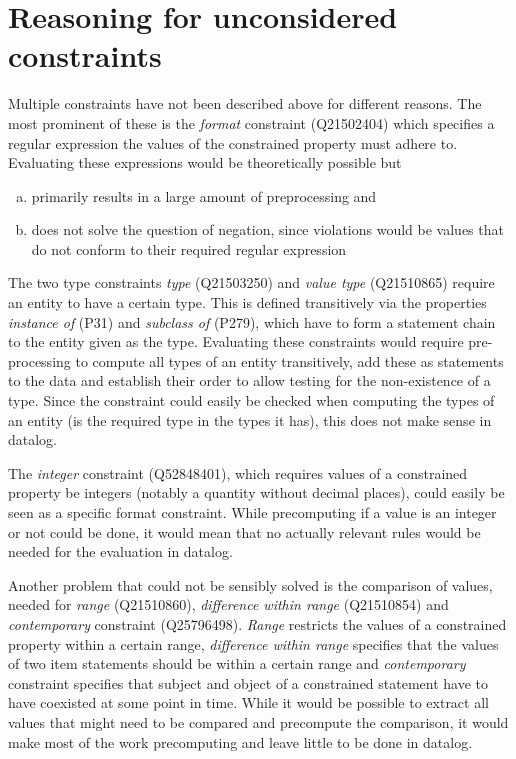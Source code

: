 \documentclass[hyperref,bachelorofscience,fleqn]{cgvpub}
\begin{document}
\section{Reasoning for unconsidered constraints}
Multiple constraints have not been described above for different reasons. The most prominent of these is the \emph{format} constraint (Q21502404) which specifies a regular expression the values of the constrained property must adhere to. Evaluating these expressions would be theoretically possible but \\
\begin{enumerate}[a)]
\item primarily results in a large amount of preprocessing and
\item does not solve the question of negation, since violations would be values that do not conform to their required regular expression
\end{enumerate}

The two type constraints \emph{type} (Q21503250) and \emph{value type} (Q21510865) require an entity to have a certain type. This is defined transitively via the properties \emph{instance of} (P31) and \emph{subclass of} (P279), which have to form a statement chain to the entity given as the type. Evaluating these constraints would require pre-processing to compute all types of an entity transitively, add these as statements to the data and establish their order to allow testing for the non-existence of a type. Since the constraint could easily be checked when computing the types of an entity (is the required type in the types it has), this does not make sense in datalog.

The \emph{integer} constraint (Q52848401), which requires values of a constrained property be integers (notably a quantity without decimal places), could easily be seen as a specific format constraint. While precomputing if a value is an integer or not could be done, it would mean that no actually relevant rules would be needed for the evaluation in datalog.

Another problem that could not be sensibly solved is the comparison of values, needed for \emph{range} (Q21510860), \emph{difference within range} (Q21510854) and \emph{contemporary} constraint (Q25796498). \emph{Range} restricts the values of a constrained property within a certain range, \emph{difference within range} specifies that the values of two item statements should be within a certain range and \emph{contemporary} constraint specifies that subject and object of a constrained statement have to have coexisted at some point in time. While it would be possible to extract all values that might need to be compared and precompute the comparison, it would make most of the work precomputing and leave little to be done in datalog.
\end{document}
